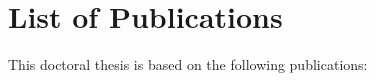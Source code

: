 \chapter*{List of Publications}
%
%
This doctoral thesis is based on the following publications: 










